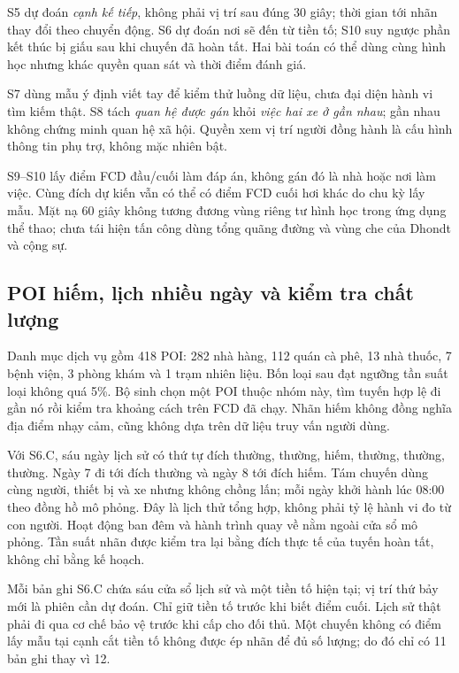 S5 dự đoán \emph{cạnh kế tiếp}, không phải vị trí sau đúng 30 giây; thời gian tới nhãn thay đổi theo chuyển động. S6 dự đoán nơi sẽ đến từ tiền tố; S10 suy ngược phần kết thúc bị giấu sau khi chuyến đã hoàn tất. Hai bài toán có thể dùng cùng hình học nhưng khác quyền quan sát và thời điểm đánh giá.~\citep{ziebart2008maxent,dhondt2022endpoint}

S7 dùng mẫu ý định viết tay để kiểm thử luồng dữ liệu, chưa đại diện hành vi tìm kiếm thật. S8 tách \emph{quan hệ được gán} khỏi \emph{việc hai xe ở gần nhau}; gần nhau không chứng minh quan hệ xã hội. Quyền xem vị trí người đồng hành là cấu hình thông tin phụ trợ, không mặc nhiên bật.~\citep{wu2021fakequery,olteanu2017interdependent}

S9--S10 lấy điểm FCD đầu/cuối làm đáp án, không gán đó là nhà hoặc nơi làm việc. Cùng đích dự kiến vẫn có thể có điểm FCD cuối hơi khác do chu kỳ lấy mẫu. Mặt nạ 60 giây không tương đương vùng riêng tư hình học trong ứng dụng thể thao; chưa tái hiện tấn công dùng tổng quãng đường và vùng che của Dhondt và cộng sự.~\citep{dhondt2022endpoint}

\subsection{POI hiếm, lịch nhiều ngày và kiểm tra chất lượng}

Danh mục dịch vụ gồm 418 POI: 282 nhà hàng, 112 quán cà phê, 13 nhà thuốc, 7 bệnh viện, 3 phòng khám và 1 trạm nhiên liệu. Bốn loại sau đạt ngưỡng tần suất loại không quá 5\%. Bộ sinh chọn một POI thuộc nhóm này, tìm tuyến hợp lệ đi gần nó rồi kiểm tra khoảng cách trên FCD đã chạy. Nhãn hiếm không đồng nghĩa địa điểm nhạy cảm, cũng không dựa trên dữ liệu truy vấn người dùng.

Với S6.C, sáu ngày lịch sử có thứ tự đích thường, thường, hiếm, thường, thường, thường. Ngày 7 đi tới đích thường và ngày 8 tới đích hiếm. Tám chuyến dùng cùng người, thiết bị và xe nhưng không chồng lấn; mỗi ngày khởi hành lúc 08:00 theo đồng hồ mô phỏng. Đây là lịch thử tổng hợp, không phải tỷ lệ hành vi đo từ con người. Hoạt động ban đêm và hành trình quay về nằm ngoài cửa sổ mô phỏng. Tần suất nhãn được kiểm tra lại bằng đích thực tế của tuyến hoàn tất, không chỉ bằng kế hoạch.

Mỗi bản ghi S6.C chứa sáu cửa sổ lịch sử và một tiền tố hiện tại; vị trí thứ bảy mới là phiên cần dự đoán. Chỉ giữ tiền tố trước khi biết điểm cuối. Lịch sử thật phải đi qua cơ chế bảo vệ trước khi cấp cho đối thủ. Một chuyến không có điểm lấy mẫu tại cạnh cắt tiền tố không được ép nhãn để đủ số lượng; do đó chỉ có 11 bản ghi thay vì 12.

